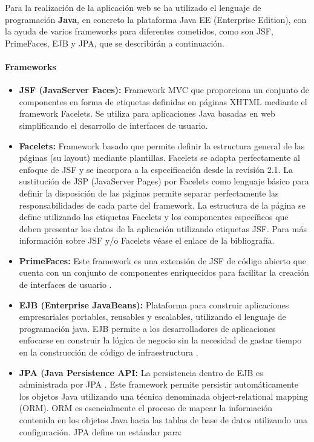 Para la realización de la aplicación web se ha utilizado el lenguaje de programación \textbf{Java}, en concreto la plataforma Java EE (Enterprise Edition), con la ayuda de varios frameworks para diferentes cometidos, como son JSF, PrimeFaces, EJB y JPA, que se describirán a continuación.

\paragraph*{Frameworks}

\begin{itemize}
\item \textbf{JSF (JavaServer Faces):} Framework MVC que proporciona un conjunto de componentes en forma de etiquetas definidas en páginas XHTML mediante el framework Facelets. Se utiliza para aplicaciones Java basadas en web simplificando el desarrollo de interfaces de usuario. 

\item \textbf{Facelets:} Framework basado que permite definir la estructura general de las páginas (su layout) mediante plantillas. Facelets se adapta perfectamente al enfoque de JSF y se incorpora a la especificación desde la revisión 2.1. La sustitución de JSP (JavaServer Pages) por Facelets como lenguaje básico para definir la disposición de las páginas permite separar perfectamente las responsabilidades de cada parte del framework. La estructura de la página se define utilizando las etiquetas Facelets y los componentes específicos que deben presentar los datos de la aplicación utilizando etiquetas JSF. Para más información sobre JSF y/o Facelets véase el enlace \cite{introduccionJSF} de la bibliografía.

\item \textbf{PrimeFaces:} Este framework es una extensión de JSF de código abierto que cuenta con un conjunto de componentes enriquecidos para facilitar la creación de interfaces de usuario \cite{PrimeFaces}.

\item \textbf{EJB (Enterprise JavaBeans):} Plataforma para construir aplicaciones empresariales portables, reusables y escalables, utilizando el lenguaje de programación java. EJB permite a los desarrolladores de aplicaciones enfocarse en construir la lógica de negocio sin la necesidad de gastar tiempo en la construcción de código de infraestructura \cite{EJB}. 

\item \textbf{JPA (Java Persistence API:} La persistencia dentro de EJB es administrada por JPA \cite{JPA}. Este framework permite persistir automáticamente los objetos Java utilizando una técnica denominada object-relational mapping (ORM). ORM es esencialmente el proceso de mapear la información contenida en los objetos Java hacia las tablas de base de datos utilizando una configuración.
JPA define un estándar para:


\end{itemize}
